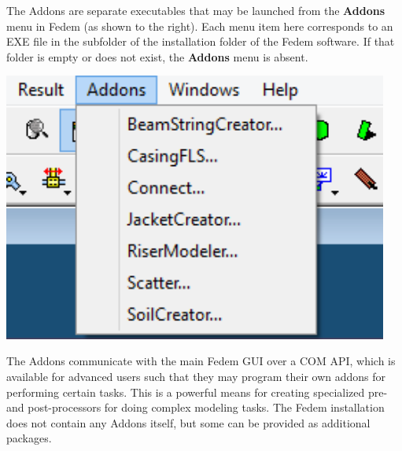 \noindent
\begin{minipage}{0.55\textwidth}
  \raggedright
  The Addons are separate executables that may be launched from the
  \textbf{Addons} menu in Fedem (as shown to the right).
  Each menu item here corresponds to an EXE file in the  subfolder
  of the installation folder of the Fedem software. If that folder is empty or
  does not exist, the \textbf{Addons} menu is absent.
\end{minipage}%
\begin{minipage}{0.45\textwidth}
  \raggedleft
  \includegraphics[width=0.95\textwidth]{Figures/2-AddonsMenu}
\end{minipage}

The Addons communicate with the main Fedem GUI over a COM API,
which is available for advanced users such that they may program their own
addons for performing certain tasks. This is a powerful means for creating
specialized pre- and post-processors for doing complex modeling tasks.
The Fedem installation does not contain any Addons itself, but some can be
provided as additional packages.
